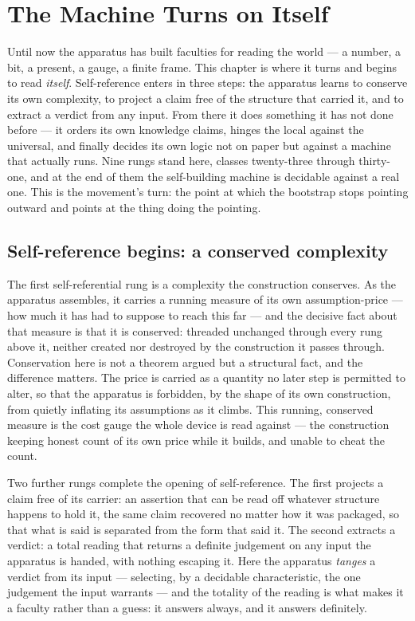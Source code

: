 \chapter{The Machine Turns on Itself}
\label{chap:machine-turns-on-itself}

Until now the apparatus has built faculties for reading the world --- a number, a bit, a present, a gauge,
a finite frame. This chapter is where it turns and begins to read \emph{itself}. Self-reference enters in
three steps: the apparatus learns to conserve its own complexity, to project a claim free of the structure
that carried it, and to extract a verdict from any input. From there it does something it has not done
before --- it orders its own knowledge claims, hinges the local against the universal, and finally decides
its own logic not on paper but against a machine that actually runs. Nine rungs stand here, classes
twenty-three through thirty-one, and at the end of them the self-building machine is decidable against a
real one. This is the movement's turn: the point at which the bootstrap stops pointing outward and points
at the thing doing the pointing.

\section{Self-reference begins: a conserved complexity}
\label{se:conserved-complexity}

The first self-referential rung is a complexity the construction conserves. As the apparatus assembles, it
carries a running measure of its own assumption-price --- how much it has had to suppose to reach this far
--- and the decisive fact about that measure is that it is conserved: threaded unchanged through every
rung above it, neither created nor destroyed by the construction it passes through. Conservation here is
not a theorem argued but a structural fact, and the difference matters. The price is carried as a quantity
no later step is permitted to alter, so that the apparatus is forbidden, by the shape of its own
construction, from quietly inflating its assumptions as it climbs. This running, conserved measure is the
cost gauge the whole device is read against --- the construction keeping honest count of its own price
while it builds, and unable to cheat the count.

Two further rungs complete the opening of self-reference. The first projects a claim free of its carrier:
an assertion that can be read off whatever structure happens to hold it, the same claim recovered no
matter how it was packaged, so that what is said is separated from the form that said it. The second
extracts a verdict: a total reading that returns a definite judgement on any input the apparatus is handed,
with nothing escaping it. Here the apparatus \emph{tanges} a verdict from its input --- selecting, by a
decidable characteristic, the one judgement the input warrants --- and the totality of the reading is what
makes it a faculty rather than a guess: it answers always, and it answers definitely.

